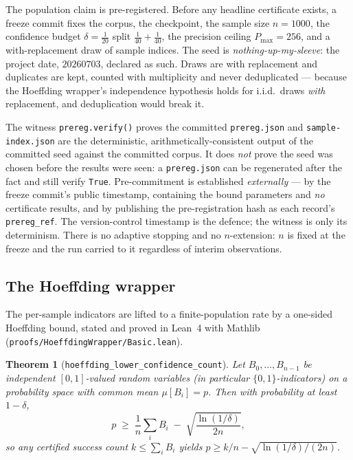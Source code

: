 \documentclass[11pt,a4paper]{article}
\newtheorem{theorem}{Theorem}
\begin{document}
The population claim is pre-registered. Before any headline certificate exists, a freeze commit fixes the corpus, the checkpoint, the sample size \(n = 1000\), the confidence budget \(\delta = \tfrac{1}{20}\) split \(\tfrac{1}{40} + \tfrac{1}{40}\), the precision ceiling \(P_{\max} = 256\), and a with-replacement draw of sample indices. The seed is \emph{nothing-up-my-sleeve}: the project date, \(20260703\), declared as such. Draws are with replacement and duplicates are kept, counted with multiplicity and never deduplicated --- because the Hoeffding wrapper's independence hypothesis holds for i.i.d.\ draws \emph{with} replacement, and deduplication would break it.

The witness \texttt{prereg.verify()} proves the committed \texttt{prereg.json} and \texttt{sample-index.json} are the deterministic, arithmetically-consistent output of the committed seed against the committed corpus. It does \emph{not} prove the seed was chosen before the results were seen: a \texttt{prereg.json} can be regenerated after the fact and still verify \texttt{True}. Pre-commitment is established \emph{externally} --- by the freeze commit's public timestamp, containing the bound parameters and \emph{no} certificate results, and by publishing the pre-registration hash as each record's \texttt{prereg\_ref}. The version-control timestamp is the defence; the witness is only its determinism. There is no adaptive stopping and no \(n\)-extension: \(n\) is fixed at the freeze and the run carried to it regardless of interim observations.

\subsection{The Hoeffding wrapper}

The per-sample indicators are lifted to a finite-population rate by a one-sided Hoeffding bound, stated and proved in Lean~4 with Mathlib (\texttt{proofs/HoeffdingWrapper/Basic.lean}).

\begin{theorem}[\texttt{hoeffding\_lower\_confidence\_count}]
Let \(B_0,\dots,B_{n-1}\) be independent \([0,1]\)-valued random variables (in particular \(\{0,1\}\)-indicators) on a probability space with common mean \(\mu[B_i] = p\). Then with probability at least \(1 - \delta\),
\[
p \;\ge\; \frac{1}{n}\sum_{i} B_i \;-\; \sqrt{\frac{\ln(1/\delta)}{2n}},
\]
so any certified success count \(k \le \sum_i B_i\) yields \(p \ge k/n - \sqrt{\ln(1/\delta)/(2n)}\).
\end{theorem}
\end{document}
